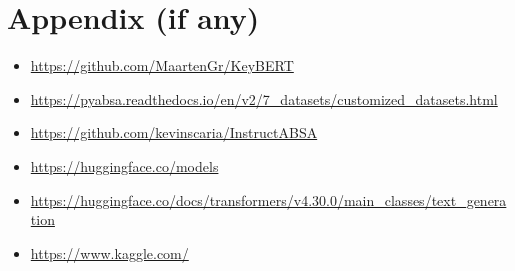 \section*{Appendix (if any)}
\begin{itemize}
    \item \url{https://github.com/MaartenGr/KeyBERT}
    \item \url{https://pyabsa.readthedocs.io/en/v2/7_datasets/customized_datasets.html}
    \item \url{https://github.com/kevinscaria/InstructABSA}
    \item \url{https://huggingface.co/models}
    \item \url{https://huggingface.co/docs/transformers/v4.30.0/main_classes/text_generation}
    \item \url{https://www.kaggle.com/}
\end{itemize}